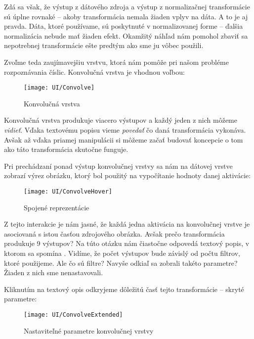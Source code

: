 \bigskip

Zdá sa však, že výstup z dátového zdroja a výstup z normalizačnej transformácie sú úplne rovnaké -- akoby transformácia nemala žiaden vplyv na dáta. A to je aj pravda. Dáta, ktoré používame, sú poskytnuté v normalizovanej forme -- ďalšia normalizácia nebude mať žiaden efekt. Okamžitý náhľad nám pomohol zbaviť sa nepotrebnej transformácie ešte predtým ako sme ju vôbec použili.

\bigskip

Zvoľme teda zaujímavejšiu vrstvu, ktorá nám pomôže pri našom probléme rozpoznávania číslic. Konvolučná vrstva je vhodnou voľbou:

\begin{figure}[H]
  \centering
  \texttt{[image: UI/Convolve]}
  \caption{Konvolučná vrstva}
\end{figure}

Konvolučná vrstva produkuje viacero výstupov a každý jeden z nich môžeme \emph{vidieť}. Vďaka textovému popisu vieme \emph{povedať} čo daná transformácia vykonáva. Avšak až vďaka priamej manipulácii si môžeme začať budovať koncepcie o tom ako táto transformácia skutočne funguje.

\bigskip

Pri prechádzaní ponad výstup konvolučnej vrstvy sa nám na dátovej vrstve zobrazí výrez obrázku, ktorý bol použitý na vypočítanie hodnoty danej aktivácie:

\begin{figure}[H]
  \centering
  \texttt{[image: UI/ConvolveHover]}
  \caption{Spojené reprezentácie}
\end{figure}

Z tejto interakcie je nám jasné, že každá jedna aktivácia na konvolučnej vrstve je asociovaná s istou časťou zdrojového obrázka. Avšak prečo transformácia produkuje 9 výstupov? Na túto otázku nám čiastočne odpovedá textový popis, v ktorom sa spomína . Vidíme, že počet výstupov bude závislý od počtu filtrov, ktoré použijeme. Ale čo sú filtre? Navyše odkiaľ sa zobrali takéto parametre? Žiaden z nich sme nenastavovali.

Kliknutím na textový opis odkryjeme dôležitú časť tejto transformácie -- skryté parametre:

\begin{figure}[H]
  \centering
  \texttt{[image: UI/ConvolveExtended]}
  \caption{Nastaviteľné parametre konvolučnej vrstvy}
\end{figure}

